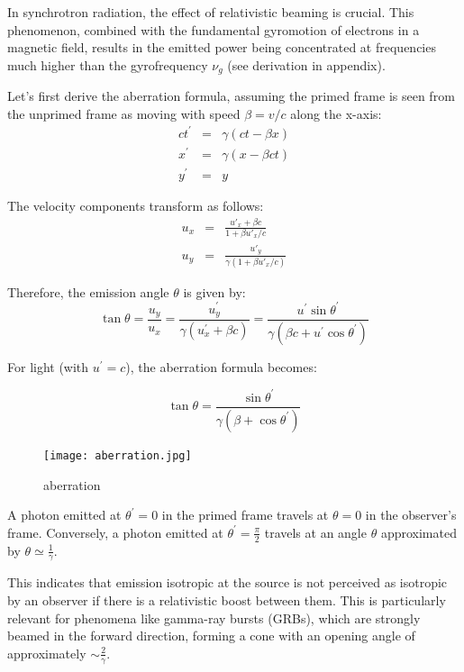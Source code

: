In synchrotron radiation, the effect of relativistic beaming is crucial. This phenomenon, combined with the fundamental gyromotion of electrons in a magnetic field, results in the emitted power being concentrated at frequencies much higher than the gyrofrequency \( \nu_g \) (see derivation in appendix).

Let's first derive the aberration formula, assuming the primed frame is seen from the unprimed frame as moving with speed $\beta = v/c$ along the x-axis:
%
\begin{eqnarray*}
c t^\prime & = & \gamma (c t - \beta x) \\
x^\prime & = & \gamma (x - \beta c t) \\
y^\prime & = & y 
\end{eqnarray*}

The velocity components transform as follows:
%
\begin{eqnarray*}
u_x & = & \frac{u'_x + \beta c}{1+\beta u'_x / c} \\
u_y & = & \frac{u'_y}{\gamma(1+\beta u'_x / c)} 
\end{eqnarray*}

Therefore, the emission angle \( \theta \) is given by:
%
\[
\tan \theta = \frac{u_y}{u_x} = \frac{u^\prime_y}{\gamma(u^\prime_x + \beta c)} = \frac{u^\prime \sin \theta^\prime}{\gamma(\beta c + u^\prime \cos \theta^\prime)} 
\]

For light (with \( u^\prime = c \)), the aberration formula becomes:
%
\begin{remark}
\[
\tan \theta = \frac{\sin \theta^\prime}{\gamma(\beta + \cos \theta^\prime)} 
\]
\end{remark}

\begin{figure}[t]
\centering
\texttt{[image: aberration.jpg]}
\caption{aberration}
\end{figure}

A photon emitted at \( \theta^\prime = 0 \) in the primed frame travels at \( \theta = 0 \) in the observer's frame. Conversely, a photon emitted at \( \theta^\prime = \frac{\pi}{2} \) travels at an angle \( \theta \) approximated by \( \theta \simeq \frac{1}{\gamma} \).

This indicates that emission isotropic at the source is not perceived as isotropic by an observer if there is a relativistic boost between them. This is particularly relevant for phenomena like gamma-ray bursts (GRBs), which are strongly beamed in the forward direction, forming a cone with an opening angle of approximately \( \sim \frac{2}{\gamma} \).

